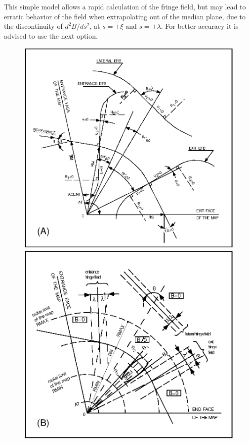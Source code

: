 \noindent This simple model allows a rapid calculation of the fringe field,
but may lead to erratic behavior of the field when extrapolating out of the median plane, 
due to the discontinuity of $ d^2B/ds^2 $,  at $ s=\pm \xi $ and $ s=\pm \lambda $. 
For better  accuracy it is advised to use the next option. 

\newpage
\begin{figure}[H]
\centering
            \includegraphics[width=12cm]{Fig9a.eps}
            \vfill
            \includegraphics[width=12cm]{Fig9b.eps}
\end{figure}  
\newpage

